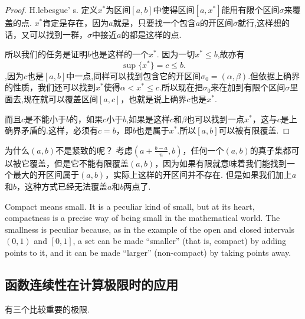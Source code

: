 \documentclass{article}
\begin{document}
\begin{proof}
\rm H.lebesgue' s. 定义$x^*$为区间$[a,b]$中使得区间$[a,x^*]$能用有限个区间$\sigma$来覆盖的点. $x^*$肯定是存在，因为$a$就是，只要找一个包含$a$的开区间$\sigma$就行,这样想的话，又可以找到一群，$\sigma$中接近$a$的都是这样的点.

所以我们的任务是证明$b$也是这样的一个$x^*$.
因为一切$x^* \leq b$,故亦有\[\sup\{x^*\}=c \leq b.\],因为$c$也是$[a,b]$中一点,同样可以找到包含它的开区间$\sigma_0=(\alpha,\beta)$.但依据上确界的性质，我们还可以找到$x^*$使得$\alpha < x^* \leq c$.所以现在把$\sigma_0$来在加到有限个区间$\sigma$里面去,现在就可以覆盖区间$[a,c]$，也就是说上确界$c$也是$x^*$.

而且$c$是不能小于$b$的，如果$c$小于$b$,如果是这样$c$和$\beta$也可以找到一点$x^*$，这与$c$是上确界矛盾的.这样，必须有$c=b$，即$b$也是属于$x^*$.所以$[a,b]$可以被有限覆盖.
\end{proof}


为什么$(a,b)$不是紧致的呢？ 考虑$(a+\frac{b-a}{n},b)$，任何一个$(a,b)$的真子集都可以被它覆盖，但是它不能有限覆盖$(a,b)$，因为如果有限就意味着我们能找到一个最大的开区间属于$(a,b)$，实际上这样的开区间并不存在. 但是如果我们加上$a$和$b$，这种方式已经无法覆盖$a$和$b$两点了.

Compact means small. It is a peculiar kind of small, but at its heart, compactness is a precise way of being small in the mathematical world. The smallness is peculiar because, as in the example of the open and closed intervals $(0,1)$ and $[0,1]$, a set can be made “smaller” (that is, compact) by adding points to it, and it can be made “larger” (non-compact) by taking points away.

\newpage
\subsection{函数连续性在计算极限时的应用}

有三个比较重要的极限.
\end{document}
